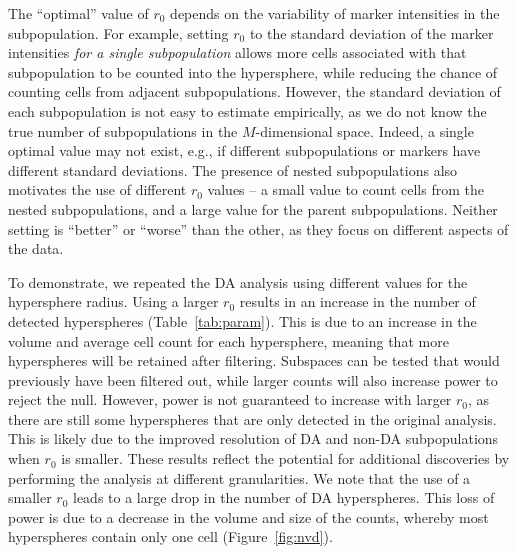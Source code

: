 \documentclass{article}
\begin{document}
The ``optimal'' value of $r_0$ depends on the variability of marker intensities in the subpopulation.
For example, setting $r_0$ to the standard deviation of the marker intensities \textit{for a single subpopulation} allows more cells associated with that subpopulation to be counted into the hypersphere, while reducing the chance of counting cells from adjacent subpopulations.
However, the standard deviation of each subpopulation is not easy to estimate empirically, as we do not know the true number of subpopulations in the $M$-dimensional space.
Indeed, a single optimal value may not exist, e.g., if different subpopulations or markers have different standard deviations.
The presence of nested subpopulations also motivates the use of different $r_0$ values -- a small value to count cells from the nested subpopulations, and a large value for the parent subpopulations.
Neither setting is ``better'' or ``worse'' than the other, as they focus on different aspects of the data.

To demonstrate, we repeated the DA analysis using different values for the hypersphere radius.
Using a larger $r_0$ results in an increase in the number of detected hyperspheres (Table~\ref{tab:param}).
This is due to an increase in the volume and average cell count for each hypersphere, meaning that more hyperspheres will be retained after filtering.
Subspaces can be tested that would previously have been filtered out, while larger counts will also increase power to reject the null.
However, power is not guaranteed to increase with larger $r_0$, as there are still some hyperspheres that are only detected in the original analysis.
This is likely due to the improved resolution of DA and non-DA subpopulations when $r_0$ is smaller.
These results reflect the potential for additional discoveries by performing the analysis at different granularities.
We note that the use of a smaller $r_0$ leads to a large drop in the number of DA hyperspheres.
This loss of power is due to a decrease in the volume and size of the counts, whereby most hyperspheres contain only one cell (Figure~\ref{fig:nvd}).
    
\end{document}
